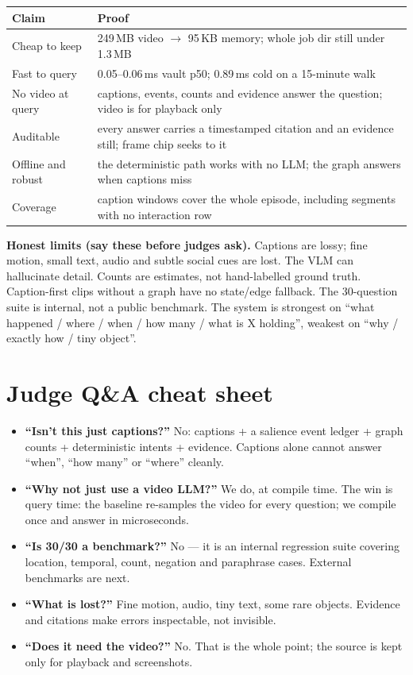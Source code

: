 \documentclass[10pt,a4paper]{article}
\begin{document}
\begin{center}
\small
\begin{tabularx}{\linewidth}{@{}l L@{}}
\toprule
\textbf{Claim} & \textbf{Proof} \\
\midrule
Cheap to keep & 249\,MB video \(\rightarrow\) 95\,KB memory; whole job dir still under 1.3\,MB \\
Fast to query & 0.05--0.06\,ms vault p50; 0.89\,ms cold on a 15-minute walk \\
No video at query & captions, events, counts and evidence answer the question; video is for playback only \\
Auditable & every answer carries a timestamped citation and an evidence still; frame chip seeks to it \\
Offline and robust & the deterministic path works with no LLM; the graph answers when captions miss \\
Coverage & caption windows cover the whole episode, including segments with no interaction row \\
\bottomrule
\end{tabularx}
\end{center}

\noindent
\textbf{Honest limits (say these before judges ask).} Captions are lossy; fine motion, small text,
audio and subtle social cues are lost. The VLM can hallucinate detail. Counts are estimates, not
hand-labelled ground truth. Caption-first clips without a graph have no state/edge fallback. The
30-question suite is internal, not a public benchmark. The system is strongest on ``what happened /
where / when / how many / what is X holding'', weakest on ``why / exactly how / tiny object''.

\vspace{2pt}

\section*{Judge Q\&A cheat sheet}

\begin{itemize}[leftmargin=1.2em,itemsep=2pt]
  \item \textbf{``Isn't this just captions?''} No: captions + a salience event ledger + graph counts
        + deterministic intents + evidence. Captions alone cannot answer ``when'', ``how many'' or
        ``where'' cleanly.
  \item \textbf{``Why not just use a video LLM?''} We do, at compile time. The win is query time: the
        baseline re-samples the video for every question; we compile once and answer in microseconds.
  \item \textbf{``Is 30/30 a benchmark?''} No --- it is an internal regression suite covering
        location, temporal, count, negation and paraphrase cases. External benchmarks are next.
  \item \textbf{``What is lost?''} Fine motion, audio, tiny text, some rare objects. Evidence and
        citations make errors inspectable, not invisible.
  \item \textbf{``Does it need the video?''} No. That is the whole point; the source is kept only for
        playback and screenshots.
\end{itemize}
\end{document}
